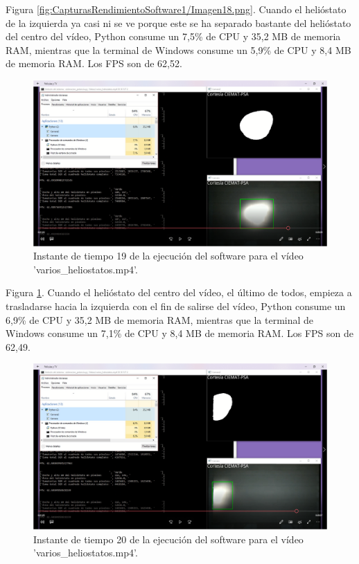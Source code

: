 Figura \ref{fig:CapturasRendimientoSoftware1/Imagen18.png}. Cuando el helióstato de la izquierda ya casi ni se ve porque este se ha separado bastante del helióstato del centro del vídeo, Python consume un 7,5\% de CPU y 35,2 MB de memoria RAM, mientras que la terminal de Windows consume un 5,9\% de CPU y 8,4 MB de memoria RAM. Los FPS son de 62,52.\\[20pt]

\begin{figure}[h!]
  	\centering
	\includegraphics[width=\textwidth]{CapturasRendimientoSoftware1/Imagen19.png}
	\caption{Instante de tiempo 19 de la ejecución del software para el vídeo 'varios\_heliostatos.mp4'.
	\label{fig:CapturasRendimientoSoftware1/Imagen19.png}}
\end{figure}

Figura \ref{fig:CapturasRendimientoSoftware1/Imagen19.png}. Cuando el helióstato del centro del vídeo, el último de todos, empieza a trasladarse hacia la izquierda con el fin de salirse del vídeo, Python consume un 6,9\% de CPU y 35,2 MB de memoria RAM, mientras que la terminal de Windows consume un 7,1\% de CPU y 8,4 MB de memoria RAM. Los FPS son de 62,49.\\[20pt]

\begin{figure}[h!]
  	\centering
	\includegraphics[width=\textwidth]{CapturasRendimientoSoftware1/Imagen20.png}
	\caption{Instante de tiempo 20 de la ejecución del software para el vídeo 'varios\_heliostatos.mp4'.
	\label{fig:CapturasRendimientoSoftware1/Imagen20.png}}
\end{figure}

